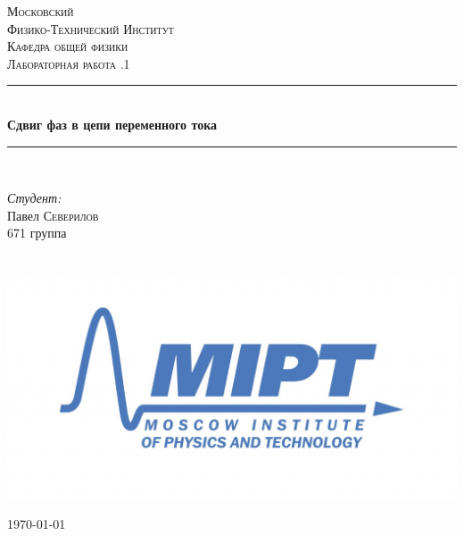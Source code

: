 \documentclass[a4paper, 12pt]{article}
\newenvironment{bottompar}{\par\vspace*{\fill}}{\clearpage}
\begin{document}
\begin{titlepage}

\newcommand{\HRule}{\rule{\linewidth}{0.5mm}} %

\center %
 

\textsc{\LARGE Московский \\[0.5cm]Физико-Технический Институт}\\[1,5cm] %
\textsc{\Large Кафедра общей физики}\\[0.5cm] %
\textsc{\large Лабораторная работа .1}\\[0.5cm] %


\HRule
\\[0.4cm]
{ \huge \bfseries Сдвиг фаз в цепи переменного тока}
\\[0.2cm] %
\HRule
\\[1.5cm]


 


	\begin{flushleft} \large
		\emph{Студент:}\\
		Павел \textsc{Северилов} \\
		671 группа
	\end{flushleft}



\begin{bottompar}
	\begin{center}
		\includegraphics[width = 80 mm]{logo.jpg}
	\end{center}
	{\large \today}

\end{bottompar}
\vfill

\end{titlepage}
\end{document}
